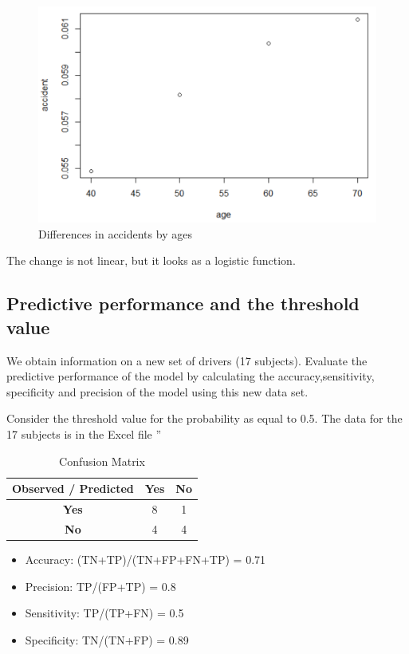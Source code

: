 \begin{figure}[H]
    \centering
    \includegraphics[scale=0.5]{difference_of_ages.PNG}
    \caption{Differences in accidents by ages}
    \label{fig:diff_ages}
\end{figure}

The change is not linear, but it looks as a logistic function.

\subsection{Predictive performance and the threshold value}

We obtain information on a new set of drivers (17 subjects). Evaluate the predictive performance of the model
by calculating the accuracy,sensitivity, specificity and precision of the model using this new data set.

Consider the threshold value for the probability as equal to 0.5. The data for the 17 subjects is in the Excel file ”

\begin{table}[H]
    \centering
    \begin{tabular}{c|c|c}
      Observed / Predicted & \textbf{Yes} & \textbf{No} \\ \hline
      \textbf{Yes} & 8 & 1 \\
      \textbf{No} & 4 & 4
    \end{tabular}
    \caption{Confusion Matrix}
    \label{tab:my_label}
\end{table}

\begin{itemize}
    \item Accuracy: (TN+TP)/(TN+FP+FN+TP) = 0.71
    \item Precision: TP/(FP+TP) = 0.8
    \item Sensitivity: TP/(TP+FN) = 0.5
    \item Specificity: TN/(TN+FP) = 0.89
\end{itemize}

